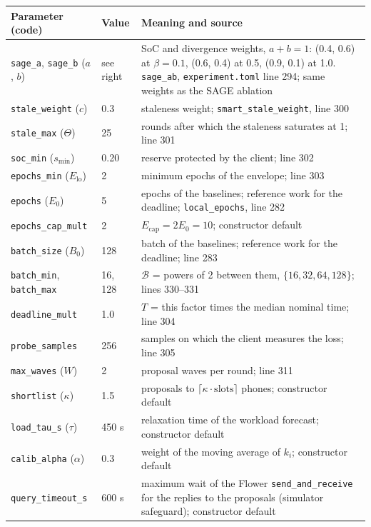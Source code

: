 \documentclass[11pt,a4paper]{article}
\newcommand{\cf}[1]{\texttt{#1}}
\begin{document}
\begin{longtable}{p{}p{}p{}}
\toprule
Parameter (code) & Value & Meaning and source \\
\midrule
\endhead
\cf{sage\_a}, \cf{sage\_b} ($a$, $b$) & see right & SoC and divergence weights, $a + b = 1$: (0.4, 0.6) at $\beta = 0.1$, (0.6, 0.4) at 0.5, (0.9, 0.1) at 1.0. \cf{sage\_ab}, \cf{experiment.toml} line 294; same weights as the SAGE ablation \\
\cf{stale\_weight} ($c$) & 0.3 & staleness weight; \cf{smart\_stale\_weight}, line 300 \\
\cf{stale\_max} ($\Theta$) & 25 & rounds after which the staleness saturates at 1; line 301 \\
\cf{soc\_min} ($s_{\min}$) & 0.20 & reserve protected by the client; line 302 \\
\cf{epochs\_min} ($E_{\mathrm{lo}}$) & 2 & minimum epochs of the envelope; line 303 \\
\cf{epochs} ($E_0$) & 5 & epochs of the baselines; reference work for the deadline; \cf{local\_epochs}, line 282 \\
\cf{epochs\_cap\_mult} & 2 & $E_{\mathrm{cap}} = 2 E_0 = 10$; constructor default \\
\cf{batch\_size} ($B_0$) & 128 & batch of the baselines; reference work for the deadline; line 283 \\
\cf{batch\_min}, \cf{batch\_max} & 16, 128 & $\mathcal{B}$ = powers of 2 between them, $\{16, 32, 64, 128\}$; lines 330--331 \\
\cf{deadline\_mult} & 1.0 & $T$ = this factor times the median nominal time; line 304 \\
\cf{probe\_samples} & 256 & samples on which the client measures the loss; line 305 \\
\cf{max\_waves} ($W$) & 2 & proposal waves per round; line 311 \\
\cf{shortlist} ($\kappa$) & 1.5 & proposals to $\lceil \kappa \cdot \text{slots} \rceil$ phones; constructor default \\
\cf{load\_tau\_s} ($\tau$) & 450 s & relaxation time of the workload forecast; constructor default \\
\cf{calib\_alpha} ($\alpha$) & 0.3 & weight of the moving average of $k_i$; constructor default \\
\cf{query\_timeout\_s} & 600 s & maximum wait of the Flower \cf{send\_and\_receive} for the replies to the proposals (simulator safeguard); constructor default \\

\end{longtable}
\end{document}
